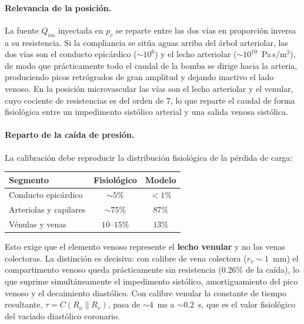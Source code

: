 \documentclass[11pt]{article}
\begin{document}
\paragraph{Relevancia de la posici\'on.} La fuente $Q_{im}$ inyectada en $p_c$
se reparte entre las dos v\'ias en proporci\'on inversa a su resistencia. Si la
compliancia se sit\'ua aguas arriba del \'arbol arteriolar, las dos v\'ias son
el conducto epic\'ardico ($\sim\!10^{6}$) y el lecho arteriolar
($\sim\!10^{10}$~Pa\,s/m$^3$), de modo que pr\'acticamente todo el caudal de la
bomba se dirige hacia la arteria, produciendo picos retr\'ogrados de gran
amplitud y dejando inactivo el lado venoso. En la posici\'on microvascular las
v\'ias son el lecho arteriolar y el venular, cuyo cociente de resistencias es
del orden de $7$, lo que reparte el caudal de forma fisiol\'ogica entre un
impedimento sist\'olico arterial y una salida venosa sist\'olica.

\paragraph{Reparto de la ca\'ida de presi\'on.} La calibraci\'on debe
reproducir la distribuci\'on fisiol\'ogica de la p\'erdida de carga:

\begin{center}\small
\begin{tabular}{lcc}
\toprule
Segmento & Fisiol\'ogico & Modelo\\
\midrule
Conducto epic\'ardico & $\sim5\%$ & $<1\%$\\
Arteriolas y capilares & $\sim75\%$ & $87\%$\\
V\'enulas y venas & $10$--$15\%$ & $13\%$\\
\bottomrule
\end{tabular}
\end{center}

\noindent
Esto exige que el elemento venoso represente el \textbf{lecho venular} y no las
venas colectoras. La distinci\'on es decisiva: con calibre de vena colectora
($r_v\!\sim\!1$~mm) el compartimento venoso queda pr\'acticamente sin
resistencia ($0.26\%$ de la ca\'ida), lo que suprime simult\'aneamente el
impedimento sist\'olico, amortigua\-miento del pico venoso y el decaimiento
diast\'olico. Con calibre venular la constante de tiempo resultante,
$\tau=C(R_a\!\parallel\!R_v)$, pasa de $\sim\!4$~ms a $\sim\!0.2$~s, que es el
valor fisiol\'ogico del vaciado diast\'olico coronario.
\end{document}
